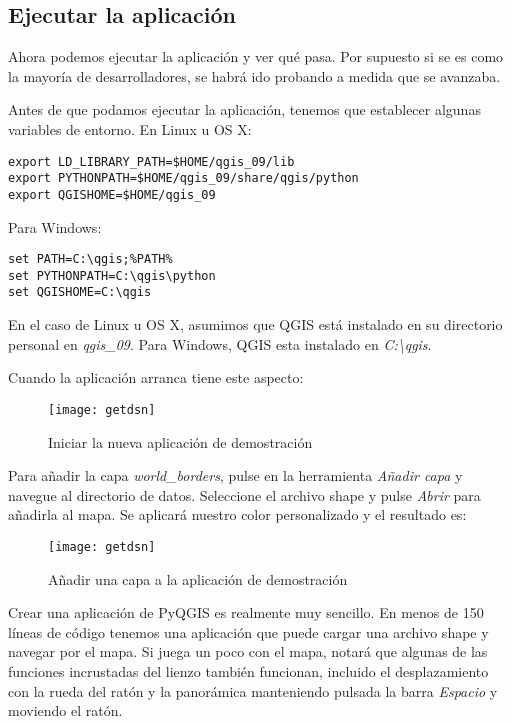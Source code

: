 \subsection{Ejecutar la aplicación}

Ahora podemos ejecutar la aplicación y ver qué pasa. Por supuesto si se es como la mayoría de desarrolladores, se 
habrá ido probando a medida que se avanzaba.

Antes de que podamos ejecutar la aplicación, tenemos que establecer algunas variables de entorno. En Linux u OS X:

\begin{verbatim}
export LD_LIBRARY_PATH=$HOME/qgis_09/lib
export PYTHONPATH=$HOME/qgis_09/share/qgis/python
export QGISHOME=$HOME/qgis_09
\end{verbatim}

Para Windows:
\begin{verbatim}
set PATH=C:\qgis;%PATH%
set PYTHONPATH=C:\qgis\python
set QGISHOME=C:\qgis
\end{verbatim}

En el caso de Linux u OS X, asumimos que QGIS está instalado en su directorio personal en \textsl{qgis\_09}. Para 
Windows, QGIS esta instalado en \textsl{C:\textbackslash qgis}.

Cuando la aplicación arranca tiene este aspecto:

\begin{figure}[ht]
\begin{center}
  \caption{Iniciar la nueva aplicación de demostración}\label{fig:demo_app_startup}\smallskip
  \texttt{[image: getdsn]}
\end{center}
\end{figure}

Para añadir la capa \textsl{world\_borders}, pulse en la herramienta \textsl{Añadir capa} y navegue al 
directorio de datos. Seleccione el archivo shape y pulse \textsl{Abrir} para añadirla al mapa. Se aplicará nuestro 
color personalizado y el resultado es:

\begin{figure}[ht]
\begin{center}
  \caption{Añadir una capa a la aplicación de demostración}\label{fig:demo_app_done}\smallskip
  \texttt{[image: getdsn]}
\end{center}
\end{figure}

Crear una aplicación de PyQGIS es realmente muy sencillo. En menos de 150 líneas de código tenemos una aplicación que 
puede cargar una archivo shape y navegar por el mapa. Si juega un poco con el mapa, notará que algunas de las 
funciones incrustadas del lienzo también funcionan, incluido el desplazamiento con la rueda del ratón y la 
panorámica manteniendo pulsada la barra \textsl{Espacio} y moviendo el ratón.

